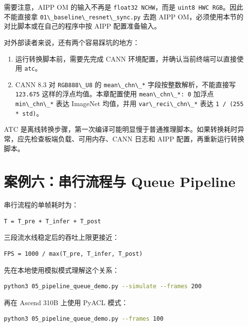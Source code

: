 需要注意，AIPP OM 的输入不再是
\passthrough{\lstinline!float32 NCHW!}，而是
\passthrough{\lstinline!uint8 HWC RGB!}。因此不能直接拿
\passthrough{\lstinline!01\_baseline\_resnet\_sync.py!} 去跑 AIPP
OM，必须使用本节的对比脚本或在自己的程序中按 AIPP 配置准备输入。

对外部读者来说，还有两个容易踩坑的地方：

\begin{enumerate}
\def\labelenumi{\arabic{enumi}.}
\tightlist
\item
  运行转换脚本前，需要先完成 CANN 环境配置，并确认当前终端可以直接使用
  \passthrough{\lstinline!atc!}。
\item
  CANN 8.3 对 \passthrough{\lstinline!RGB888\_U8!} 的
  \passthrough{\lstinline!mean\_chn\_*!} 字段按整数解析，不能直接写
  \passthrough{\lstinline!123.675!} 这样的浮点均值。本章配置使用
  \passthrough{\lstinline!mean\_chn\_*: 0!} 加浮点
  \passthrough{\lstinline!min\_chn\_*!} 表达 ImageNet 均值，并用
  \passthrough{\lstinline!var\_reci\_chn\_*!} 表达
  \passthrough{\lstinline!1 / (255 * std)!}。
\end{enumerate}

ATC
是离线转换步骤，第一次编译可能明显慢于普通推理脚本。如果转换耗时异常，应先检查板端负载、可用内存、CANN
日志和 AIPP 配置，再重新运行转换脚本。

\section{案例六：串行流程与 Queue Pipeline}\label{src-book-chapter8-h14}

串行流程的单帧耗时为：

\begin{lstlisting}
T = T_pre + T_infer + T_post
\end{lstlisting}

三段流水线稳定后的吞吐上限更接近：

\begin{lstlisting}
FPS = 1000 / max(T_pre, T_infer, T_post)
\end{lstlisting}

先在本地使用模拟模式理解这个关系：

\begin{lstlisting}[language=bash]
python3 05_pipeline_queue_demo.py --simulate --frames 200
\end{lstlisting}

再在 Ascend 310B 上使用 PyACL 模式：

\begin{lstlisting}[language=bash]
python3 05_pipeline_queue_demo.py --frames 100
\end{lstlisting}

